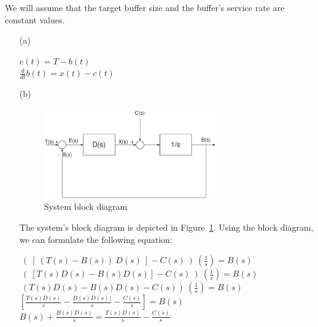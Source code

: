 \documentclass{article}
\begin{document}
\begin{enumerate}
\noindent We will assume that the target buffer size and the
buffer's service rate are constant values.


\bigbreak \bigbreak

\begin{itemize}

\item[(a)] \smallbreak

\noindent $e(t) = T - b(t)$\\
\noindent ${\frac{d}{dt}} b(t) = x(t) - c(t)$


\bigbreak \bigbreak

\item[(b)] \smallbreak

\begin{figure}[htp]
\centerline{
  \includegraphics[width=0.7\textwidth]{figures/blockDiagram}
  }
   \caption{System block diagram}
   \label{fig:sol-block}
\end{figure}

\noindent The system's block diagram is depicted in Figure~\ref{fig:sol-block}.
Using the block diagram, we can formulate the following equation:
\bigbreak

\noindent $~( ~[ ~(T(s) - B(s)) ~D(s)~] - C(s)~) ~({\frac{1}{s}}) = B(s)$\\

\noindent $~( ~[T(s)D(s) - B(s)D(s)] - C(s)~) ~({\frac{1}{s}}) = B(s)$\\

\noindent $~(T(s)D(s) - B(s)D(s) - C(s)) ~({\frac{1}{s}}) = B(s)$\\

\noindent $[{\frac{T(s) D(s)}{s}} - {\frac{B(s) D(s))}{s}} -
{\frac{C(s)}{s}}] = B(s)$\\

\noindent $B(s) + {\frac{B(s) D(s)}{s}} = {\frac{T(s) D(s)}{s}} -
{\frac{C(s)}{s}}$\\


\end{itemize}
\end{enumerate}
\end{document}
